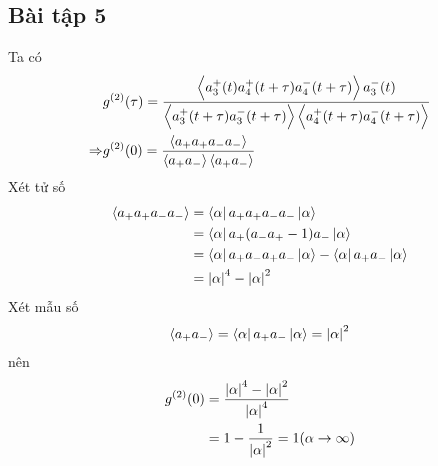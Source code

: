 \documentclass{report}
\newcommand{\f}[2]{\dfrac{#1}{#2}}
\begin{document}
\subsection*{Bài tập 5}
Ta có
\begin{align*}
	&g^{(2)}(\tau) = \f{\ev{a_{3}^{+}(t) a_{4}^{+}(t + \tau) a_{4}^{-}(t + \tau)} a_{3}^{-}(t)}{\ev{a_{3}^{+}(t+ \tau) a_{3}^{-}(t+ \tau)} \ev{a_{4}^{+}(t + \tau) a_{4}^{-}(t+ \tau) }}\\
	\Rightarrow & g^{(2)}(0) = \f{\ev{a_{+} a_{+} a_{-} a_{-}}}{\ev{a_{+} a_{-}} \ev{a_{+} a_{-}}}
\end{align*}
Xét tử số
\begin{align*}
	\ev{a_{+} a_{+} a_{-} a_{-}} 
	&= \bra{\alpha} a_{+} a_{+} a_{-} a_{-} \ket{\alpha}\\
	&= \bra{\alpha} a_{+} ( a_{-} a_{+} - 1) a_{-} \ket{\alpha}\\
	&= \bra{\alpha} a_{+} a_{-} a_{+}  a_{-} \ket{\alpha} - \bra{\alpha} a_{+} a_{-} \ket{\alpha}\\
	&= \abs{\alpha}^{4} - \abs{\alpha}^{2}
\end{align*}	
Xét mẫu số
\begin{align*}
	\ev{a_{+} a_{-}} = \bra{\alpha} a_{+} a_{-} \ket{\alpha} = \abs{\alpha}^{2}
\end{align*}	
nên 
\begin{align*}
	g^{(2)}(0)
	&= \f{\abs{\alpha}^{4} - \abs{\alpha}^{2}}{\abs{\alpha}^{4}}\\
	&= 1 - \f{1}{\abs{\alpha}^{2}} = 1 ( \alpha \rightarrow \infty)
\end{align*}
\end{document}

